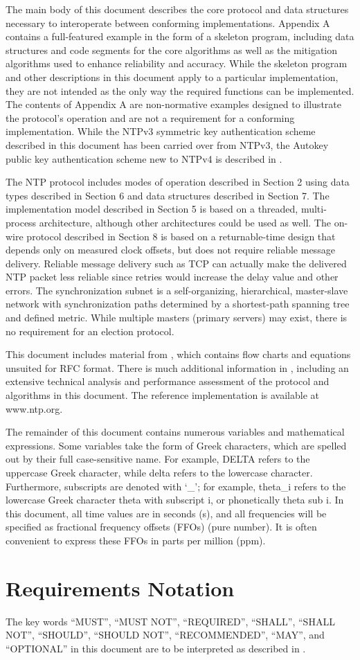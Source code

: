 The main body of this document describes the core protocol and data
structures necessary to interoperate between conforming
implementations. Appendix A contains a full-featured example in the
form of a skeleton program, including data structures and code
segments for the core algorithms as well as the mitigation algorithms
used to enhance reliability and accuracy. While the skeleton program
and other descriptions in this document apply to a particular
implementation, they are not intended as the only way the required
functions can be implemented. The contents of Appendix A are non-normative
examples designed to illustrate the protocol's operation
and are not a requirement for a conforming implementation. While the
NTPv3 symmetric key authentication scheme described in this document
has been carried over from NTPv3, the Autokey public key
authentication scheme new to NTPv4 is described in \cite{RFC5906}.

The NTP protocol includes modes of operation described in Section 2
using data types described in Section 6 and data structures described
in Section 7. The implementation model described in Section 5 is
based on a threaded, multi-process architecture, although other
architectures could be used as well. The on-wire protocol described
in Section 8 is based on a returnable-time design that depends only
on measured clock offsets, but does not require reliable message
delivery. Reliable message delivery such as TCP \cite{RFC0793} can
actually make the delivered NTP packet less reliable since retries
would increase the delay value and other errors. The synchronization
subnet is a self-organizing, hierarchical, master-slave network with
synchronization paths determined by a shortest-path spanning tree and
defined metric. While multiple masters (primary servers) may exist,
there is no requirement for an election protocol.

This document includes material from \cite{ref9}, which contains flow
charts and equations unsuited for RFC format. There is much
additional information in \cite{ref7}, including an extensive technical
analysis and performance assessment of the protocol and algorithms in
this document. The reference implementation is available at
www.ntp.org.

The remainder of this document contains numerous variables and
mathematical expressions. Some variables take the form of Greek
characters, which are spelled out by their full case-sensitive name.
For example, DELTA refers to the uppercase Greek character, while
delta refers to the lowercase character. Furthermore, subscripts are
denoted with `\_'; for example, theta\_i refers to the lowercase Greek
character theta with subscript i, or phonetically theta sub i. In
this document, all time values are in seconds (s), and all
frequencies will be specified as fractional frequency offsets (FFOs)
(pure number). It is often convenient to express these FFOs in parts
per million (ppm).

\section{Requirements Notation}

The key words ``MUST'', ``MUST NOT'', ``REQUIRED'', ``SHALL'', ``SHALL NOT'',
``SHOULD'', ``SHOULD NOT'', ``RECOMMENDED'', ``MAY'', and ``OPTIONAL'' in this
document are to be interpreted as described in \cite{RFC2119}.
